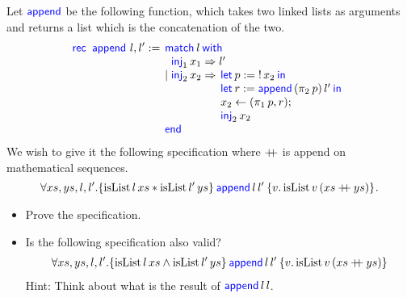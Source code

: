 \begin{exercise}
  \label{exercise:append}
  Let $\textsf{\color{blue} append}$ be the following function, which
  takes two linked lists as arguments and returns 
  a list which is the concatenation of the two.
  \begin{displaymath}
    \Rec{\ \langkw{append}} l, l' =
    \MatchML{l}with{\Inj{1} x_1}=>{l'}|{\Inj{2} x_2}=>{\begin{array}[t]{l}\Let p = \deref x_2 in\\
                                                         \Let r = \langkw{append}\, (\Proj{2} p)\, l' in\\
                                                         x_2 \gets (\Proj{1} p, r);\\
                                                         \Inj{2} x_2
                                                       \end{array}}end{}
  \end{displaymath}
  We wish to give it the following specification where $\mathbin{+\mkern-7mu+}$ is append on mathematical sequences.
  \begin{displaymath}
    \forall xs, ys, l, l'.\hoare{\operatorname{isList} l\, xs \ast \operatorname{isList} l'\,ys}{\langkw{append}\,l\,l'}{v.\operatorname{isList} v\,(xs \mdoubleplus ys)}.
  \end{displaymath}

  \begin{itemize}
  \item Prove the specification.
  \item Is the following specification also valid?
    \begin{align*}
      \forall xs, ys, l, l'.\hoare{\operatorname{isList} l\, xs \land \operatorname{isList} l'\,ys}{\langkw{append}\,l\,l'}{v.\operatorname{isList} v\,(xs \mdoubleplus ys)}
    \end{align*}
    Hint: Think about what is the result of $\textsf{\color{blue} append}\,l\,l$.
  \end{itemize}
\end{exercise}

